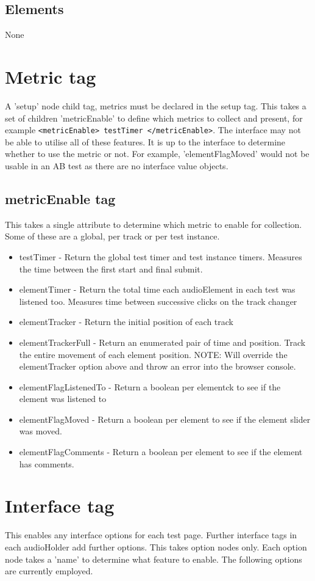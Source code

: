 \documentclass{article}
\begin{document}
\subsection{Elements}
None

\section{Metric tag}
A 'setup' node child tag, metrics must be declared in the setup tag. This takes a set of children 'metricEnable' to define which metrics to collect and present, for example \texttt{<metricEnable> testTimer </metricEnable>}. The interface may not be able to utilise all of these features. It is up to the interface to determine whether to use the metric or not. For example, 'elementFlagMoved' would not be usable in an AB test as there are no interface value objects.

\subsection{metricEnable tag}
This takes a single attribute to determine which metric to enable for collection. Some of these are a global, per track or per test instance.
\begin{itemize}
\item testTimer - Return the global test timer and test instance timers. Measures the time between the first start and final submit.
\item elementTimer - Return the total time each audioElement in each test was listened too. Measures time between successive clicks on the track changer
\item elementTracker - Return the initial position of each track
\item elementTrackerFull - Return an enumerated pair of time and position. Track the entire movement of each element position. NOTE: Will override the elementTracker option above and throw an error into the browser console.
\item elementFlagListenedTo - Return a boolean per elementck to see if the element was listened to
\item elementFlagMoved - Return a boolean per element to see if the element slider was moved.
\item elementFlagComments - Return a boolean per element to see if the element has comments.
\end{itemize}

\section{Interface tag}
This enables any interface options for each test page. Further interface tags in each audioHolder add further options. This takes option nodes only. Each option node takes a 'name' to determine what feature to enable. The following options are currently employed.
\end{document}
